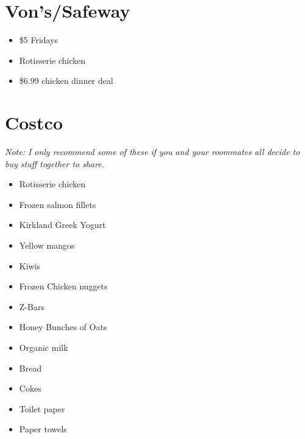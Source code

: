 \documentclass{article}
\begin{document}
\section{Von's/Safeway}
\begin{itemize}
\item{\$5 Fridays}
\item{Rotisserie chicken}
\item{\$6.99 chicken dinner deal}
\end{itemize}
\section{Costco}
\textit{Note: I only recommend some of these if you and your roommates all decide to buy stuff together to share.}
\begin{itemize}
\item{Rotisserie chicken}
\item{Frozen salmon fillets}
\item{Kirkland Greek Yogurt}
\item{Yellow mangos}
\item{Kiwis}
\item{Frozen Chicken nuggets}
\item{Z-Bars}
\item{Honey Bunches of Oats}
\item{Organic milk}
\item{Bread}
\item{Cokes}
\item{Toilet paper}
\item{Paper towels}
\end{itemize}
\end{document}
